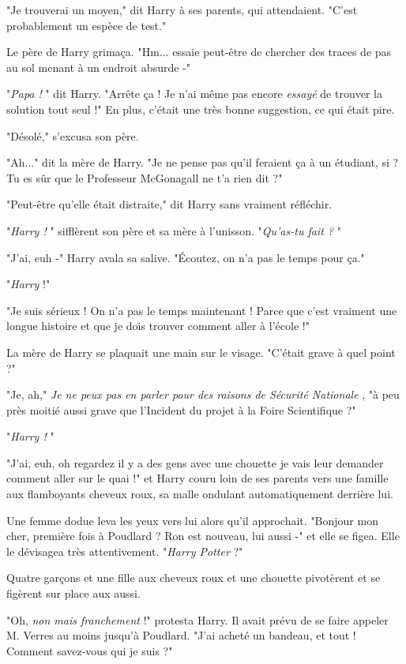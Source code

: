 "Je trouverai un moyen," dit Harry à ses parents, qui attendaient. "C'est probablement un espèce de test."

Le père de Harry grimaça. "Hm... essaie peut-être de chercher des traces de pas au sol menant à un endroit absurde -"

"\emph{Papa !} " dit Harry. "Arrête ça ! Je n'ai même pas encore \emph{essayé}  de trouver la solution tout seul !" En plus, c'était une très bonne suggestion, ce qui était pire.

"Désolé," s'excusa son père.

"Ah..." dit la mère de Harry. "Je ne pense pas qu'il feraient ça à un étudiant, si ? Tu es sûr que le Professeur McGonagall ne t'a rien dit ?"

"Peut-être qu'elle était distraite," dit Harry sans vraiment réfléchir.

"\emph{Harry !} " sifflèrent son père et sa mère à l'unisson. "\emph{Qu'as-tu fait ?} "

"J'ai, euh -" Harry avala sa salive. "Écoutez, on n'a pas le temps pour ça."

"\emph{Harry}  !"

"Je suis sérieux ! On n'a pas le temps maintenant ! Parce que c'est vraiment une longue histoire et que je dois trouver comment aller à l'école !"

La mère de Harry se plaquait une main sur le visage. "C'était grave à quel point ?"

"Je, ah," \emph{Je ne peux pas en parler pour des raisons de Sécurité Nationale} , "à peu près moitié aussi grave que l'Incident du projet à la Foire Scientifique ?"

"\emph{Harry !} "

"J'ai, euh, oh regardez il y a des gens avec une chouette je vais leur demander comment aller sur le quai !" et Harry couru loin de ses parents vers une famille aux flamboyants cheveux roux, sa malle ondulant automatiquement derrière lui.

Une femme dodue leva les yeux vers lui alors qu'il approchait. "Bonjour mon cher, première fois à Poudlard ? Ron est nouveau, lui aussi -" et elle se figea. Elle le dévisagea très attentivement. "\emph{Harry Potter}  ?"

Quatre garçons et une fille aux cheveux roux et une chouette pivotèrent et se figèrent sur place aux aussi.

"Oh, \emph{non mais franchement}  !" protesta Harry. Il avait prévu de se faire appeler M. Verres au moins jusqu'à Poudlard. "J'ai acheté un bandeau, et tout ! Comment savez-vous qui je suis ?"


